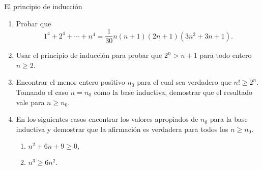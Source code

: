 \begin{section}{El principio de inducción}
\begin{enumerate}
\item Probar que
$$
1^4+2^4+\cdots+n^4= \frac{1}{30}n(n+1)(2n+1)(3n^2+3n+1).
$$
\item Usar el principio de inducción para probar que $2^n>n+1$ para todo
entero $n\ge2$.

\item Encontrar el menor entero positivo $n_0$ para el cual sea
verdadero que $n! \ge 2^n$. Tomando el caso $n=n_0$ como la base
inductiva, demostrar que el resultado vale para $n\ge n_0$.

\item En los siguientes casos encontrar los valores apropiados de $n_0$
para la base inductiva y demostrar que la afirmación es verdadera
para todos los $n\ge n_0$.
\begin{enumerate}
	\item $n^2 +6n + 9 \ge 0,$
	\item $n^3 \ge 6n^2.$
\end{enumerate}

\end{enumerate}
\end{section}

